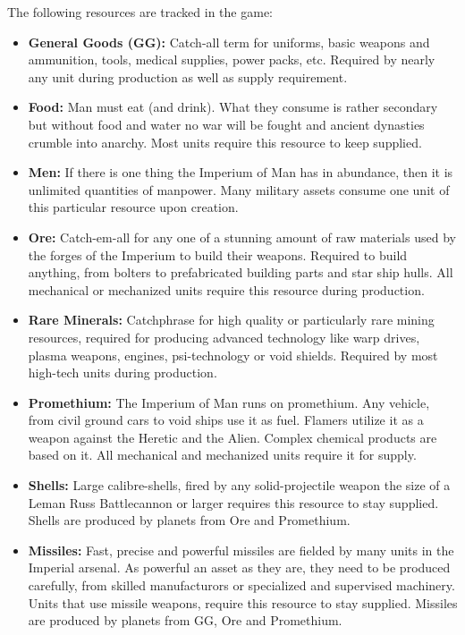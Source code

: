 The following resources are tracked in the game: 
\begin{itemize} 
    \item \textbf{General Goods (GG):} Catch-all term for uniforms, basic weapons and ammunition, tools, medical supplies, power packs, etc. Required by nearly any unit during production as well as supply requirement. 
    \item \textbf{Food:} Man must eat (and drink). What they consume is rather secondary but without food and water no war will be fought and ancient dynasties crumble into anarchy. Most units require this resource to keep supplied. 
    \item \textbf{Men:} If there is one thing the Imperium of Man has in abundance, then it is unlimited quantities of manpower. Many military assets consume one unit of this particular resource upon creation. 
    \item \textbf{Ore:} Catch-em-all for any one of a stunning amount of raw materials used by the forges of the Imperium to build their weapons. Required to build anything, from bolters to prefabricated building parts and star ship hulls. All mechanical or mechanized units require this resource during production. 
    \item \textbf{Rare Minerals:} Catchphrase for high quality or particularly rare mining resources, required for producing advanced technology like warp drives, plasma weapons, engines, psi-technology or void shields. Required by most high-tech units during production. 
    \item \textbf{Promethium:} The Imperium of Man runs on promethium. Any vehicle, from civil ground cars to void ships use it as fuel. Flamers utilize it as a weapon against the Heretic and the Alien. Complex chemical products are based on it. All mechanical and mechanized units require it for supply. 
    \item \textbf{Shells:} Large calibre-shells, fired by any solid-projectile weapon the size of a Leman Russ Battlecannon or larger requires this resource to stay supplied. Shells are produced by planets from Ore and Promethium. 
    \item \textbf{Missiles:} Fast, precise and powerful missiles are fielded by many units in the Imperial arsenal. As powerful an asset as they are, they need to be produced carefully, from skilled manufacturors or specialized and supervised machinery. Units that use missile weapons, require this resource to stay supplied. Missiles are produced by planets from GG, Ore and Promethium. 
\end{itemize} 

